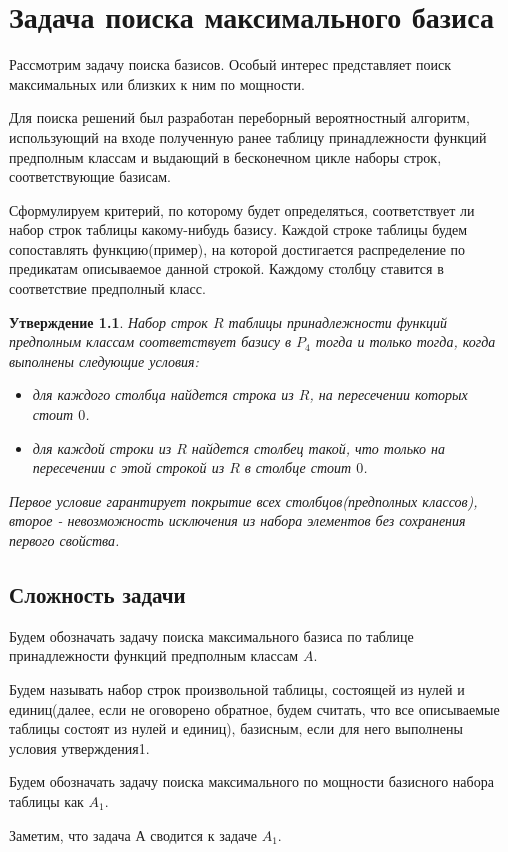 \documentclass[a4paper,14pt]{extreport}
\newtheorem{utv}{Утверждение}
\begin{document}
\newpage
\chapter{Задача поиска максимального базиса}
Рассмотрим задачу поиска базисов. Особый интерес представляет поиск максимальных или близких к ним по мощности. 

Для поиска решений был разработан переборный вероятностный алгоритм, использующий на входе полученную ранее таблицу принадлежности функций предполным классам и выдающий в бесконечном цикле наборы строк, соответствующие базисам. 

Сформулируем критерий, по которому будет определяться, соответствует ли набор строк таблицы какому-нибудь базису.
Каждой строке таблицы будем сопоставлять функцию(пример), на которой достигается распределение по предикатам описываемое данной строкой. Каждому столбцу ставится в соответствие предполный класс.  
\begin{utv}
Набор строк $R$ таблицы принадлежности функций предполным классам соответствует базису в $P_4$ тогда и только тогда, когда выполнены следующие условия:
\begin{itemize}
\item для каждого столбца найдется строка из $R$, на пересечении которых стоит $0$.    
\item для каждой строки из $R$ найдется столбец такой, что только на пересечении с этой строкой из $R$ в столбце стоит $0$.   
\end{itemize}
Первое условие гарантирует покрытие всех столбцов(предполных классов), второе - невозможность исключения из набора элементов без сохранения первого свойства. 
\end{utv}

\section{Сложность задачи}
Будем обозначать задачу поиска максимального базиса по таблице принадлежности функций предполным классам $A$.

Будем называть набор строк произвольной таблицы, состоящей из нулей и единиц(далее, если не оговорено обратное, будем считать, что все описываемые таблицы состоят из нулей и единиц), базисным, если для него выполнены условия утверждения1.

Будем обозначать задачу поиска максимального по мощности базисного набора таблицы как $A_1$.

Заметим, что задача А сводится к задаче $A_1$.
\end{document}
